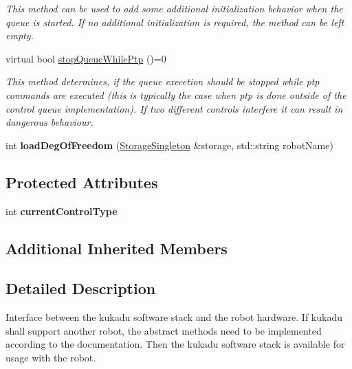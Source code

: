 \begin{DoxyCompactItemize}
\begin{DoxyCompactList}\small\item\em This method can be used to add some additional initialization behavior when the queue is started. If no additional initialization is required, the method can be left empty. \end{DoxyCompactList}\item 
virtual bool \hyperlink{classkukadu_1_1ControlQueue_a6ebb66d1bd2188e1fca3ee1440b8c0fe}{stop\+Queue\+While\+Ptp} ()=0
\begin{DoxyCompactList}\small\item\em This method determines, if the queue execetion should be stopped while ptp commands are executed (this is typically the case when ptp is done outside of the control queue implementation). If two different controls interfere it can result in dangerous behaviour. \end{DoxyCompactList}\item 
int {\bfseries load\+Deg\+Of\+Freedom} (\hyperlink{classkukadu_1_1StorageSingleton}{Storage\+Singleton} \&storage, std\+::string robot\+Name)\hypertarget{classkukadu_1_1ControlQueue_a3b67b32a4724ad089741b51377c98054}{}\label{classkukadu_1_1ControlQueue_a3b67b32a4724ad089741b51377c98054}

\end{DoxyCompactItemize}
\subsection*{Protected Attributes}
\begin{DoxyCompactItemize}
\item 
int {\bfseries current\+Control\+Type}\hypertarget{classkukadu_1_1ControlQueue_aadba228efd6e34095ce7d52bc94a4d29}{}\label{classkukadu_1_1ControlQueue_aadba228efd6e34095ce7d52bc94a4d29}

\end{DoxyCompactItemize}
\subsection*{Additional Inherited Members}


\subsection{Detailed Description}
Interface between the kukadu software stack and the robot hardware. If kukadu shall support another robot, the abstract methods need to be implemented according to the documentation. Then the kukadu software stack is available for usage with the robot. 

